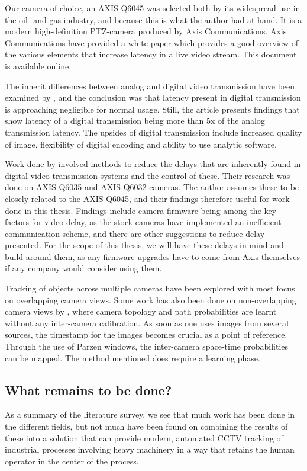 Our camera of choice, an AXIS Q6045 was selected both by its widespread use in the oil- and gas industry, and because this is what the author had at hand. It is a modern high-definition PTZ-camera produced by Axis Communications.  Axis Communications have provided a white paper which provides a good overview of the various elements that increase latency in a live video stream. This document is available online. \citep{axis15}

The inherit differences between analog and digital video transmission have been examined by \citet{hill10}, and the conclusion was that latency present in digital transmission is approaching negligible for normal usage. Still, the article presents findings that show latency of a digital transmission being more than 5x of the analog transmission latency. The upsides of digital transmission include increased quality of image, flexibility of digital encoding and ability to use analytic software.

Work done by \citet{svensson13} involved methods to reduce the delays that are inherently found in digital video transmission systems and the control of these. Their research was done on AXIS Q6035 and AXIS Q6032 cameras. The author assumes these to be closely related to the AXIS Q6045, and their findings therefore useful for work done in this thesis. Findings include camera firmware being among the key factors for video delay, as the stock cameras have implemented an inefficient communication scheme, and there are other suggestions to reduce delay presented. For the scope of this thesis, we will have these delays in mind and build around them, as any firmware upgrades have to come from Axis themselves if any company would consider using them.

Tracking of objects across multiple cameras have been explored with most focus on overlapping camera views. Some work has also been done on non-overlapping camera views by \citet{javed03}, where camera topology and path probabilities are learnt without any inter-camera calibration. As soon as one uses images from several sources, the timestamp for the images becomes crucial as a point of reference. Through the use of Parzen windows, the inter-camera space-time probabilities can be mapped. The method mentioned does require a learning phase.

\subsection{What remains to be done?}
As a summary of the literature survey, we see that much work has been done in the different fields, but not much have been found on combining the results of these into a solution that can provide modern, automated CCTV tracking of industrial processes involving heavy machinery in a way that retains the human operator in the center of the process.

